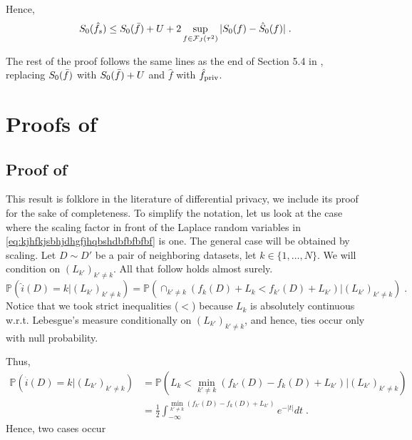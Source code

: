\documentclass{article}
\theoremstyle{plain}
\theoremstyle{definition}
\theoremstyle{remark}
\newcommand{\Prob}[0]{\mathbb{P}}
\newcommand\p[1]{\left( {#1}\right)}
\begin{document}
Hence,
\begin{equation}
    {S}_0(\hat{f}_s) \leq {S}_0(\Bar{f}) + U + 2 \sup_{f \in \mathcal{F}_J(\tau^2)} | S_0(f) - \hat{S}_0(f) | \;.
\end{equation}

The rest of the proof follows the same lines as the end of Section 5.4 in \cite{hutter2021minimax}, replacing ${S}_0(\Bar{f})$ with ${S}_0(\Bar{f}) + U$ and $\hat{f}$ with $\hat{f}_{\text{\normalshape priv}}$.




\section{Proofs of }

\subsection{Proof of }
This result is folklore in the literature of differential privacy, we include its proof for the sake of completeness.
To simplify the notation, let us look at the case where the scaling factor in front of the Laplace random variables in \eqref{eq:kjhfkjsbhjdhgfjhqbshdbfbfbfbf} is one. The general case will be obtained by scaling.
Let $D \sim D'$ be a pair of neighboring datasets, 
let $k \in \{1 , \dots, N \}$.
We will condition on $(L_{k'})_{k' \neq k}$. All that follow holds almost surely.
\begin{equation}
    \Prob \p{\hat{i}(D) = k | (L_{k'})_{k' \neq k}} 
    =
    \Prob \p{\cap_{k' \neq k} \p{f_k(D) + L_k < f_{k'}(D) + L_{k'}}| (L_{k'})_{k' \neq k}} \;.
\end{equation}
Notice that we took strict inequalities ($<$) because $L_k$ is absolutely continuous w.r.t. Lebesgue's measure conditionally on $(L_{k'})_{k' \neq k}$, and hence, ties occur only with null probability.

Thus,
\begin{equation}
\begin{aligned}
    \Prob \p{\hat{i}(D) = k | (L_{k'})_{k' \neq k}} 
    &=
    \Prob \p{L_k < \min_{k' \neq k} \p{f_{k'}(D) - f_{k}(D) + L_{k'}} \bigg| (L_{k'})_{k' \neq k}} \\
    &= \frac{1}{2} \int_{-\infty}^{\min_{k' \neq k} \p{f_{k'}(D) - f_{k}(D) + L_{k'}}} e^{- |t|} dt\;.
\end{aligned}
\end{equation}
Hence, two cases occur
\end{document}
